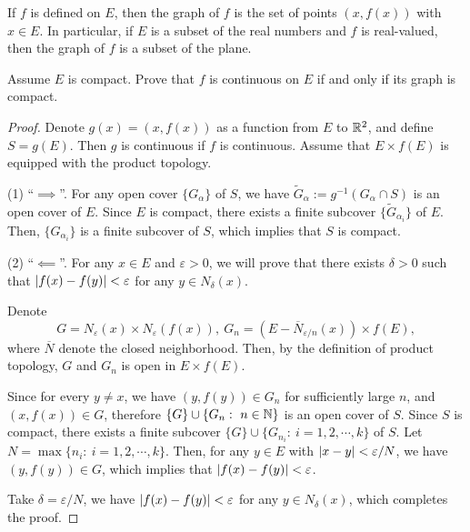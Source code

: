 \documentclass{article}
\begin{document}
\begin{problem}[4-6]
If $f$ is defined on $E$, then the graph of $f$ is the set of points $(x,f(x))$ with $x\in E$. In particular, if $E$ is a subset of the real numbers and $f$ is real-valued, then the graph of $f$ is a subset of the plane.

Assume $E$ is compact. Prove that $f$ is continuous on $E$ if and only if its graph is compact.
\end{problem}

\begin{proof}
  Denote \( g(x)=(x,f(x)) \) as a function from \( E \) to \( \mathbb{R}^2 \), and define \( S=g(E) \). Then \( g \) is continuous if \( f \) is continuous. Assume that \( E\times f(E) \) is equipped with the product topology.\par
  (1) ``\( \implies \)''. For any open cover \( \{G_\alpha\} \) of \( S \), we have \( \tilde{G}_\alpha:=g^{-1}(G_\alpha\cap S) \) is an open cover of \( E \). Since \( E \) is compact, there exists a finite subcover \( \{\tilde{G}_{\alpha_i}\} \) of \( E \). Then, \( \{G_{\alpha_i}\} \) is a finite subcover of \( S \), which implies that \( S \) is compact.\par
  (2) ``\( \impliedby \)''. For any \( x\in E \) and \( \varepsilon>0 \), we will prove that there exists \( \delta>0 \) such that \( \left|f(x)-f(y)\right|<\varepsilon \) for any \( y\in N_\delta(x) \).\par
  Denote
  \[ G=N_{\varepsilon}(x)\times N_{\varepsilon}(f(x)),\ G_n=\left( E-\overline{N}_{\varepsilon/n}(x) \right)\times f(E), \]
  where \( \overline{N} \) denote the closed neighborhood. Then, by the definition of product topology, \( G \) and \( G_{n} \) is open in \( E\times f(E) \). \par
  Since for every \( y\neq x \), we have \( (y,f(y))\in G_n \) for sufficiently large \( n \), and \( (x,f(x))\in G \), therefore \( \{G\}\cup\{G_n:\ n\in\mathbb{N}\} \) is an open cover of \( S \). Since \( S \) is compact, there exists a finite subcover \( \{G\}\cup\{G_{n_i}:\ i=1,2,\cdots,k\} \) of \( S \). Let \( N=\max\{n_i:\ i=1,2,\cdots,k\} \). Then, for any \( y\in E \) with \( \left|x-y\right|<\varepsilon/N \), we have \( (y,f(y))\in G \), which implies that \( \left|f(x)-f(y)\right|<\varepsilon \).\par
  Take \( \delta=\varepsilon/N \), we have \( \left|f(x)-f(y)\right|<\varepsilon \) for any \( y\in N_\delta(x) \), which completes the proof.
\end{proof}
\end{document}
